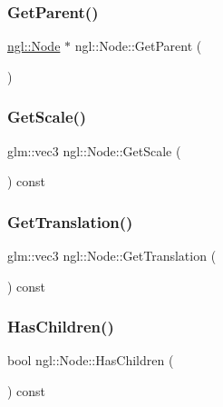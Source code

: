\subsubsection{\texorpdfstring{Get\+Parent()}{GetParent()}}
{\footnotesize\ttfamily \mbox{\hyperlink{classngl_1_1_node}{ngl\+::\+Node}} $\ast$ ngl\+::\+Node\+::\+Get\+Parent (\begin{DoxyParamCaption}{ }\end{DoxyParamCaption})}

\mbox{\label{classngl_1_1_node_a1afed96e8fae1a836c84b3ddfe61632a}} 
\subsubsection{\texorpdfstring{Get\+Scale()}{GetScale()}}
{\footnotesize\ttfamily glm\+::vec3 ngl\+::\+Node\+::\+Get\+Scale (\begin{DoxyParamCaption}{ }\end{DoxyParamCaption}) const}

\mbox{\label{classngl_1_1_node_a1d6174ab5ec4b47c685b392c08eee705}} 
\subsubsection{\texorpdfstring{Get\+Translation()}{GetTranslation()}}
{\footnotesize\ttfamily glm\+::vec3 ngl\+::\+Node\+::\+Get\+Translation (\begin{DoxyParamCaption}{ }\end{DoxyParamCaption}) const}

\mbox{\label{classngl_1_1_node_afdc404a6c7a7dd52ac16f05e19f8e7f1}} 
\subsubsection{\texorpdfstring{Has\+Children()}{HasChildren()}}
{\footnotesize\ttfamily bool ngl\+::\+Node\+::\+Has\+Children (\begin{DoxyParamCaption}{ }\end{DoxyParamCaption}) const}

